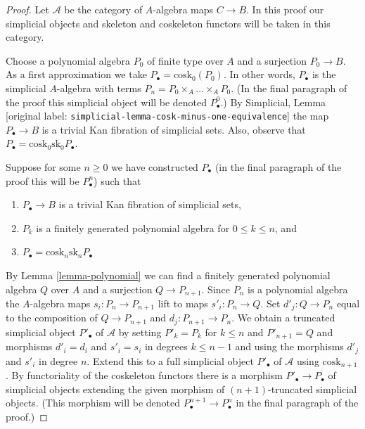 \documentclass[10pt,a4paper]{article}
\theoremstyle{plain}
\theoremstyle{definition}
\theoremstyle{remark}
\numberwithin{equation}{subsection}
\begin{document}
\begin{proof}
Let $\mathcal{A}$ be the category of $A$-algebra maps $C \to B$.
In this proof our simplicial objects and skeleton and coskeleton
functors will be taken in this category.

\medskip\noindent
Choose a polynomial algebra $P_0$ of finite type over $A$ and a surjection
$P_0 \to B$. As a first approximation we take
$P_\bullet = \text{cosk}_0(P_0)$. In other words, $P_\bullet$ is the simplicial
$A$-algebra with terms $P_n = P_0 \times_A \ldots \times_A P_0$.
(In the final paragraph of the proof this simplicial object will
be denoted $P^0_\bullet$.) By
Simplicial, Lemma \textnormal{[original label: \nolinkurl{simplicial-lemma-cosk-minus-one-equivalence}]}
the map $P_\bullet \to B$ is a trivial Kan fibration of simplicial sets.
Also, observe that $P_\bullet = \text{cosk}_0 \text{sk}_0 P_\bullet$.

\medskip\noindent
Suppose for some $n \geq 0$ we have constructed $P_\bullet$
(in the final paragraph of the proof this will be $P^n_\bullet$)
such that
\begin{enumerate}
\item[(a)] $P_\bullet \to B$ is a trivial Kan fibration of simplicial sets,
\item[(b)] $P_k$ is a finitely generated polynomial algebra for
$0 \leq k \leq n$, and
\item[(c)] $P_\bullet = \text{cosk}_n \text{sk}_n P_\bullet$
\end{enumerate}
By Lemma \ref{lemma-polynomial}
we can find a finitely generated polynomial algebra $Q$ over $A$
and a surjection $Q \to P_{n + 1}$. Since $P_n$ is a polynomial algebra
the $A$-algebra maps $s_i : P_n \to P_{n + 1}$ lift to maps
$s'_i : P_n \to Q$. Set $d'_j : Q \to P_n$ equal to the composition of
$Q \to P_{n + 1}$ and $d_j : P_{n + 1} \to P_n$.
We obtain a truncated simplicial object $P'_\bullet$ of $\mathcal{A}$
by setting $P'_k = P_k$ for $k \leq n$ and $P'_{n + 1} = Q$ and morphisms
$d'_i = d_i$ and $s'_i = s_i$ in degrees $k \leq n - 1$ and using the
morphisms $d'_j$ and $s'_i$ in degree $n$. Extend this to a full simplicial
object $P'_\bullet$ of $\mathcal{A}$ using $\text{cosk}_{n + 1}$. By
functoriality of the coskeleton functors there is a morphism
$P'_\bullet \to P_\bullet$ of simplicial objects extending the
given morphism of $(n + 1)$-truncated simplicial objects.
(This morphism will be denoted $P^{n + 1}_\bullet \to P^n_\bullet$
in the final paragraph of the proof.)


\end{proof}
\end{document}
